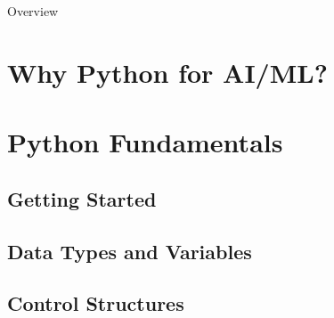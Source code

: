 \documentclass[11pt]{beamer}
\begin{document}

\begin{frame}
    \titlepage
\end{frame}

\begin{frame}[allowframebreaks,t]{Overview}
    \tableofcontents[pausesections]
\end{frame}





\section{Why Python for AI/ML?}


\section{Python Fundamentals}
\subsection{Getting Started}


\subsection{Data Types and Variables}


\subsection{Control Structures}

\end{document}
